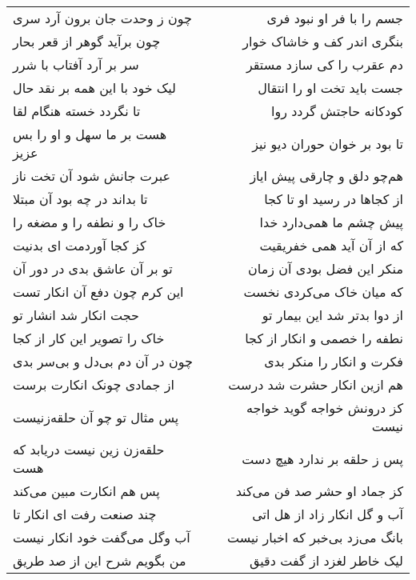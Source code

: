 \begin{center}
\begin{longtable}{l p{0.5cm} r}
\\
چون ز وحدت جان برون آرد سری
&&
جسم را با فر او نبود فری
\\
چون برآید گوهر از قعر بحار
&&
بنگری اندر کف و خاشاک خوار
\\
سر بر آرد آفتاب با شرر
&&
دم عقرب را کی سازد مستقر
\\
لیک خود با این همه بر نقد حال
&&
جست باید تخت او را انتقال
\\
تا نگردد خسته هنگام لقا
&&
کودکانه حاجتش گردد روا
\\
هست بر ما سهل و او را بس عزیز
&&
تا بود بر خوان حوران دیو نیز
\\
عبرت جانش شود آن تخت ناز
&&
هم‌چو دلق و چارقی پیش ایاز
\\
تا بداند در چه بود آن مبتلا
&&
از کجاها در رسید او تا کجا
\\
خاک را و نطفه را و مضغه را
&&
پیش چشم ما همی‌دارد خدا
\\
کز کجا آوردمت ای بدنیت
&&
که از آن آید همی خفریقیت
\\
تو بر آن عاشق بدی در دور آن
&&
منکر این فضل بودی آن زمان
\\
این کرم چون دفع آن انکار تست
&&
که میان خاک می‌کردی نخست
\\
حجت انکار شد انشار تو
&&
از دوا بدتر شد این بیمار تو
\\
خاک را تصویر این کار از کجا
&&
نطفه را خصمی و انکار از کجا
\\
چون در آن دم بی‌دل و بی‌سر بدی
&&
فکرت و انکار را منکر بدی
\\
از جمادی چونک انکارت برست
&&
هم ازین انکار حشرت شد درست
\\
پس مثال تو چو آن حلقه‌زنیست
&&
کز درونش خواجه گوید خواجه نیست
\\
حلقه‌زن زین نیست دریابد که هست
&&
پس ز حلقه بر ندارد هیچ دست
\\
پس هم انکارت مبین می‌کند
&&
کز جماد او حشر صد فن می‌کند
\\
چند صنعت رفت ای انکار تا
&&
آب و گل انکار زاد از هل اتی
\\
آب وگل می‌گفت خود انکار نیست
&&
بانگ می‌زد بی‌خبر که اخبار نیست
\\
من بگویم شرح این از صد طریق
&&
لیک خاطر لغزد از گفت دقیق
\\
\end{longtable}
\end{center}
